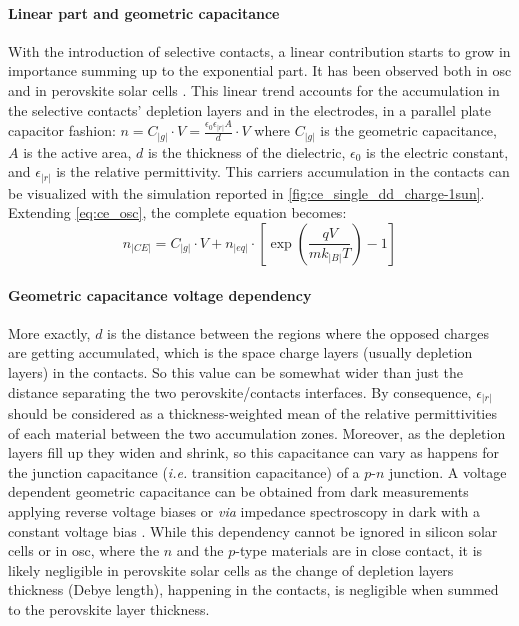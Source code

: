 		\paragraph{Linear part and geometric capacitance}\label{geometric_capacitance}
		With the introduction of selective contacts, a linear contribution starts to grow in importance summing up to the exponential part.
		It has been observed both in \gls{osc} \cite{Ryan2017a,Credgington2014,Credgington2012} and in perovskite solar cells \cite{Gelmetti2017,Wheeler2017,Du2018}.
		This linear trend accounts for the accumulation in the selective contacts' depletion layers and in the electrodes, in a parallel plate capacitor fashion: $n = C_|g| \cdot V = \frac{\epsilon_0 \epsilon_|r| A}{d} \cdot V$ where $C_|g|$ is the geometric capacitance, $A$ is the active area, $d$ is the thickness of the dielectric, $\epsilon_0$ is the electric constant, and $\epsilon_|r|$ is the relative permittivity.
		This carriers accumulation in the contacts can be visualized with the simulation reported in \cref{fig:ce_single_dd_charge-1sun}.
		Extending \cref{eq:ce_osc}, the complete equation becomes:
		\begin{equation}\label{eq:ce_full}
			n_|CE| = C_|g| \cdot V + n_|eq| \cdot \left[\exp(\frac{qV}{mk_|B|T}) - 1\right]
		\end{equation}

		\paragraph{Geometric capacitance voltage dependency}\label{geometric_capacitance_and_voltage}
		More exactly, $d$ is the distance between the regions where the opposed charges are getting accumulated, which is the space charge layers (usually depletion layers) in the contacts.
		So this value can be somewhat wider than just the distance separating the two perovskite/contacts interfaces.
		By consequence, $\epsilon_|r|$ should be considered as a thickness\hyp{}weighted mean of the relative permittivities of each material between the two accumulation zones.
		Moreover, as the depletion layers fill up they widen and shrink, so this capacitance can vary as happens for the junction capacitance (\textsl{i.e.} transition capacitance) of a $p$-$n$ junction.
		A voltage dependent geometric capacitance can be obtained from dark  measurements applying reverse voltage biases \cite{Kiermasch2018} or \textsl{via} impedance spectroscopy in dark with a constant voltage bias \cite{Brus2016,Pockett2015}.
		While this dependency cannot be ignored in silicon solar cells or in \gls{osc}, where the $n$ and the $p$-type materials are in close contact, it is likely negligible in perovskite solar cells as the change of depletion layers thickness (Debye length), happening in the contacts, is negligible when summed to the perovskite layer thickness.

